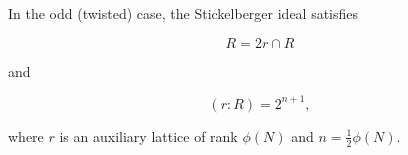 In the odd (twisted) case, the Stickelberger ideal satisfies

$$
R = 2r \cap R
$$

and

$$
(r : R) = 2^{n+1},
$$

where $r$ is an auxiliary lattice of rank $\phi(N)$ and $n = \frac{1}{2}\phi(N)$.